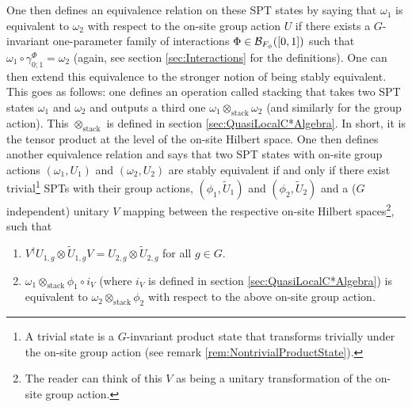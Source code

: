 \documentclass[11pt,a4paper,twoside]{article}
\numberwithin{equation}{section}
\begin{document}
	\\\\
	One then defines an equivalence relation on these SPT states by saying that $\omega_1$ is equivalent to $\omega_2$ with respect to the on-site group action $U$ if there exists a $G$-invariant one-parameter family of interactions $\Phi\in\mathcal B_{F_\phi}([0,1])$ such that $\omega_1\circ\gamma^\Phi_{0;1}=\omega_2$ (again, see section \ref{sec:Interactions} for the definitions). One can then extend this equivalence to the stronger notion of being stably equivalent. This goes as follows: one defines an operation called stacking that takes two SPT states $\omega_1$ and $\omega_2$ and outputs a third one $\omega_1\otimes_{\text{stack}}\omega_2$ (and similarly for the group action). This $\otimes_\text{stack}$ is defined in section \ref{sec:QuasiLocalC*Algebra}. In short, it is the tensor product at the level of the on-site Hilbert space. One then defines another equivalence relation and says that two SPT states with on-site group actions $(\omega_1,U_1)$ and $(\omega_2,U_2)$ are stably equivalent if and only if there exist trivial\footnote{A trivial state is a $G$-invariant product state that transforms trivially under the on-site group action (see remark \ref{rem:NontrivialProductState}).} SPTs with their group actions, $(\phi_1,\tilde{U}_1)$ and $(\phi_2,\tilde{U}_2)$ and a ($G$ independent) unitary $V$ mapping between the respective on-site Hilbert spaces\footnote{The reader can think of this $V$ as being a unitary transformation of the on-site group action.}, such that
	\begin{enumerate}
		\item $V^\dagger U_{1,g}\otimes \tilde{U}_{1,g}V=U_{2,g}\otimes \tilde{U}_{2,g}$ for all $g\in G$.
		\item $\omega_1\otimes_{\text{stack}}\phi_1\circ i_V$ (where $i_V$ is defined in section \ref{sec:QuasiLocalC*Algebra}) is equivalent to $\omega_2\otimes_{\text{stack}}\phi_2$ with respect to the above on-site group action.
	\end{enumerate}
\end{document}
